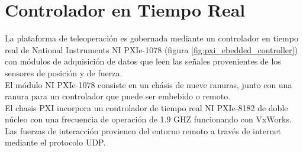 









\section{Controlador en Tiempo Real }

La plataforma de teleoperación es gobernada mediante un controlador en tiempo real de National Instruments NI PXIe-1078 (figura \ref{fig:pxi_ebedded_controller}) con módulos de adquisición de datos que leen las señales provenientes de los sensores de posición y de fuerza.\\



El módulo NI PXIe-1078 consiste en un chásis de nueve ranuras, junto con una ranura para un controlador que puede ser embebido o remoto.\\


El chasis PXI incorpora un controlador de tiempo real NI PXIe-8182 de doble núcleo con una frecuencia de operación de 1.9 GHZ funcionando con VxWorks. Las fuerzas de interacción provienen del entorno remoto  a través de internet mediante el protocolo UDP.\\

